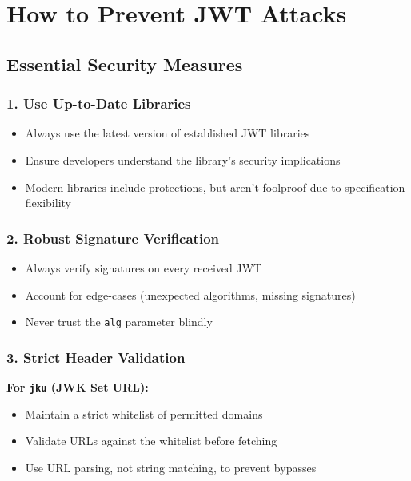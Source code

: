 \documentclass{article}
\begin{document}
\section{How to Prevent JWT Attacks}

\subsection{Essential Security Measures}

\subsubsection{1. Use Up-to-Date Libraries}
\begin{itemize}
    \item Always use the latest version of established JWT libraries
    \item Ensure developers understand the library's security implications
    \item Modern libraries include protections, but aren't foolproof due to specification flexibility
\end{itemize}

\subsubsection{2. Robust Signature Verification}
\begin{itemize}
    \item Always verify signatures on every received JWT
    \item Account for edge-cases (unexpected algorithms, missing signatures)
    \item Never trust the \texttt{alg} parameter blindly
\end{itemize}

\subsubsection{3. Strict Header Validation}

\textbf{For \texttt{jku} (JWK Set URL):}
\begin{itemize}
    \item Maintain a strict whitelist of permitted domains
    \item Validate URLs against the whitelist before fetching
    \item Use URL parsing, not string matching, to prevent bypasses
\end{itemize}
\end{document}
